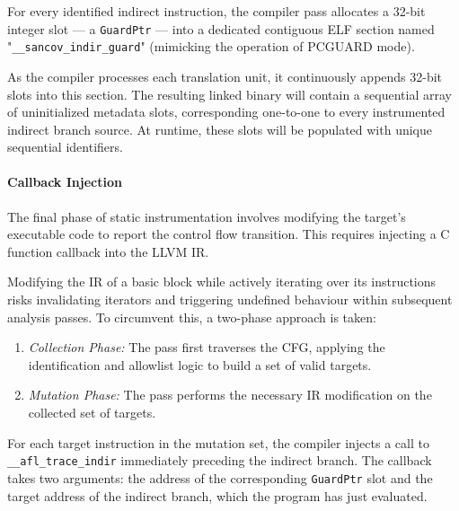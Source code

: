 For every identified indirect instruction, the compiler pass allocates a 32-bit integer slot --- a \texttt{GuardPtr} --- into a dedicated contiguous ELF section named "\texttt{\_\_sancov\_indir\_guard}" (mimicking the operation of PCGUARD mode).

As the compiler processes each translation unit, it continuously appends 32-bit slots into this section. The resulting linked binary will contain a sequential array of uninitialized metadata slots, corresponding one-to-one to every instrumented indirect branch source. At runtime, these slots will be populated with unique sequential identifiers.

\paragraph{Callback Injection} The final phase of static instrumentation involves modifying the target's executable code to report the control flow transition. This requires injecting a C function callback into the LLVM IR.

Modifying the IR of a basic block while actively iterating over its instructions risks invalidating iterators and triggering undefined behaviour within subsequent analysis passes. To circumvent this, a two-phase approach is taken: 
\begin{enumerate}
    \item \textit{Collection Phase:} The pass first traverses the CFG, applying the identification and allowlist logic to build a set of valid targets.

    \item \textit{Mutation Phase:} The pass performs the necessary IR modification on the collected set of targets.
\end{enumerate}

For each target instruction in the mutation set, the compiler injects a call to \texttt{\_\_afl\_trace\_indir} immediately preceding the indirect branch. The callback takes two arguments: the address of the corresponding \texttt{GuardPtr} slot and the target address of the indirect branch, which the program has just evaluated.
